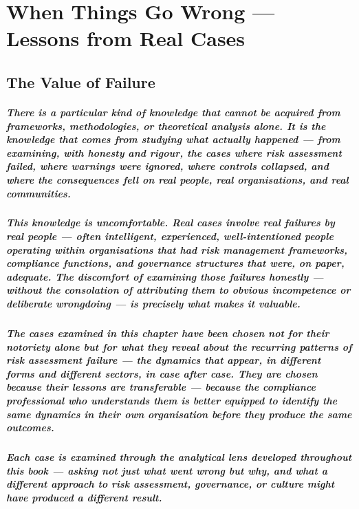 \chapter{When Things Go Wrong — Lessons from Real Cases}
\label{chap:When Things Go Wrong — Lessons from Real Cases}

\section{The Value of Failure}
\paragraph{There is a particular kind of knowledge that cannot be acquired from frameworks, methodologies, or theoretical analysis alone. It is the knowledge that comes from studying what actually happened — from examining, with honesty and rigour, the cases where risk assessment failed, where warnings were ignored, where controls collapsed, and where the consequences fell on real people, real organisations, and real communities.}
\paragraph{This knowledge is uncomfortable. Real cases involve real failures by real people — often intelligent, experienced, well-intentioned people operating within organisations that had risk management frameworks, compliance functions, and governance structures that were, on paper, adequate. The discomfort of examining those failures honestly — without the consolation of attributing them to obvious incompetence or deliberate wrongdoing — is precisely what makes it valuable.}
\paragraph{The cases examined in this chapter have been chosen not for their notoriety alone but for what they reveal about the recurring patterns of risk assessment failure — the dynamics that appear, in different forms and different sectors, in case after case. They are chosen because their lessons are transferable — because the compliance professional who understands them is better equipped to identify the same dynamics in their own organisation before they produce the same outcomes.}
\paragraph{Each case is examined through the analytical lens developed throughout this book — asking not just what went wrong but why, and what a different approach to risk assessment, governance, or culture might have produced a different result.}

